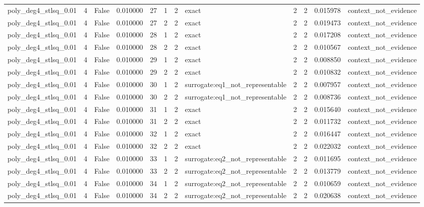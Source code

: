 \begin{tabular}{lrrrrrrlrrrl}
poly\_deg4\_stlsq\_0.01 & 4 & False & 0.010000 & 27 & 1 & 2 & exact & 2 & 2 & 0.015978 & context\_not\_evidence \\
poly\_deg4\_stlsq\_0.01 & 4 & False & 0.010000 & 27 & 2 & 2 & exact & 2 & 2 & 0.019473 & context\_not\_evidence \\
poly\_deg4\_stlsq\_0.01 & 4 & False & 0.010000 & 28 & 1 & 2 & exact & 2 & 2 & 0.017208 & context\_not\_evidence \\
poly\_deg4\_stlsq\_0.01 & 4 & False & 0.010000 & 28 & 2 & 2 & exact & 2 & 2 & 0.010567 & context\_not\_evidence \\
poly\_deg4\_stlsq\_0.01 & 4 & False & 0.010000 & 29 & 1 & 2 & exact & 2 & 2 & 0.008850 & context\_not\_evidence \\
poly\_deg4\_stlsq\_0.01 & 4 & False & 0.010000 & 29 & 2 & 2 & exact & 2 & 2 & 0.010832 & context\_not\_evidence \\
poly\_deg4\_stlsq\_0.01 & 4 & False & 0.010000 & 30 & 1 & 2 & surrogate:eq1\_not\_representable & 2 & 2 & 0.007957 & context\_not\_evidence \\
poly\_deg4\_stlsq\_0.01 & 4 & False & 0.010000 & 30 & 2 & 2 & surrogate:eq1\_not\_representable & 2 & 2 & 0.008736 & context\_not\_evidence \\
poly\_deg4\_stlsq\_0.01 & 4 & False & 0.010000 & 31 & 1 & 2 & exact & 2 & 2 & 0.015640 & context\_not\_evidence \\
poly\_deg4\_stlsq\_0.01 & 4 & False & 0.010000 & 31 & 2 & 2 & exact & 2 & 2 & 0.011732 & context\_not\_evidence \\
poly\_deg4\_stlsq\_0.01 & 4 & False & 0.010000 & 32 & 1 & 2 & exact & 2 & 2 & 0.016447 & context\_not\_evidence \\
poly\_deg4\_stlsq\_0.01 & 4 & False & 0.010000 & 32 & 2 & 2 & exact & 2 & 2 & 0.022032 & context\_not\_evidence \\
poly\_deg4\_stlsq\_0.01 & 4 & False & 0.010000 & 33 & 1 & 2 & surrogate:eq2\_not\_representable & 2 & 2 & 0.011695 & context\_not\_evidence \\
poly\_deg4\_stlsq\_0.01 & 4 & False & 0.010000 & 33 & 2 & 2 & surrogate:eq2\_not\_representable & 2 & 2 & 0.013779 & context\_not\_evidence \\
poly\_deg4\_stlsq\_0.01 & 4 & False & 0.010000 & 34 & 1 & 2 & surrogate:eq2\_not\_representable & 2 & 2 & 0.010659 & context\_not\_evidence \\
poly\_deg4\_stlsq\_0.01 & 4 & False & 0.010000 & 34 & 2 & 2 & surrogate:eq2\_not\_representable & 2 & 2 & 0.020638 & context\_not\_evidence \\

\end{tabular}
